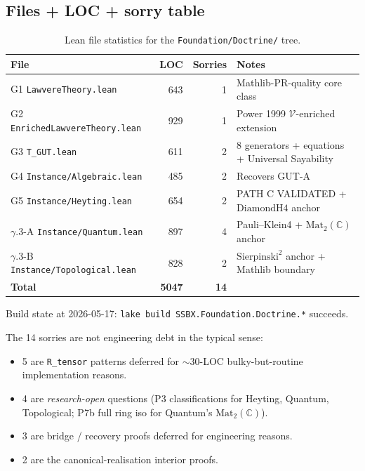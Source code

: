 \documentclass[11pt,a4paper]{article}
\theoremstyle{plain}
\theoremstyle{definition}
\theoremstyle{remark}
\newcommand{\C}{\mathbb{C}}
\newcommand{\Mat}{\mathrm{Mat}}
\newcommand{\DiamondH}{\mathrm{DiamondH4}}
\newcommand{\Sierp}{\mathrm{Sierpinski}}
\begin{document}
\subsection{Files + LOC + sorry table}\label{sec:lean:loc}

\begin{table}[h!]
\centering
\small
\begin{tabular}{lrrl}
\toprule
File & LOC & Sorries & Notes \\
\midrule
G1 \texttt{LawvereTheory.lean} & 643 & 1 & Mathlib-PR-quality core class \\
G2 \texttt{EnrichedLawvereTheory.lean} & 929 & 1 & Power 1999 $\mathcal{V}$-enriched extension \\
G3 \texttt{T\_GUT.lean} & 611 & 2 & 8 generators + equations + Universal Sayability \\
G4 \texttt{Instance/Algebraic.lean} & 485 & 2 & Recovers GUT-A \\
G5 \texttt{Instance/Heyting.lean} & 654 & 2 & PATH C VALIDATED + $\DiamondH$ anchor \\
$\gamma$.3-A \texttt{Instance/Quantum.lean} & 897 & 4 & Pauli--Klein4 + $\Mat_2(\C)$ anchor \\
$\gamma$.3-B \texttt{Instance/Topological.lean} & 828 & 2 & $\Sierp^2$ anchor + Mathlib boundary \\
\midrule
\textbf{Total} & \textbf{5047} & \textbf{14} & \\
\bottomrule
\end{tabular}
\caption{Lean file statistics for the \texttt{Foundation/Doctrine/} tree.}\label{tab:lean-loc}
\end{table}

Build state at 2026-05-17: \texttt{lake build SSBX.Foundation.Doctrine.*} succeeds.

The 14 sorries are not engineering debt in the typical sense:
\begin{itemize}[leftmargin=*]
\item 5 are \texttt{R\_tensor} patterns deferred for ${\sim}30$-LOC bulky-but-routine implementation reasons.
\item 4 are \emph{research-open} questions (P3 classifications for Heyting, Quantum, Topological; P7b full ring iso for Quantum's $\Mat_2(\C)$).
\item 3 are bridge / recovery proofs deferred for engineering reasons.
\item 2 are the canonical-realisation interior proofs.
\end{itemize}
\end{document}
